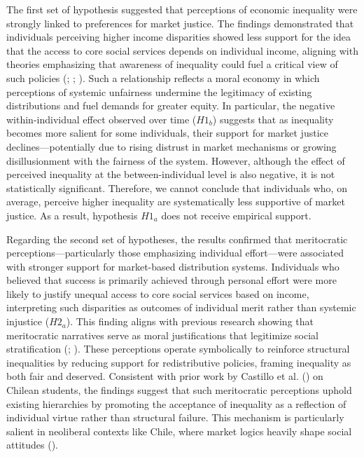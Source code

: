 \documentclass[
  12pt,
]{article}
\begin{document}
The first set of hypothesis suggested that perceptions of economic
inequality were strongly linked to preferences for market justice. The
findings demonstrated that individuals perceiving higher income
disparities showed less support for the idea that the access to core
social services depends on individual income, aligning with theories
emphasizing that awareness of inequality could fuel a critical view of
such policies (;
;
). Such a relationship
reflects a moral economy in which perceptions of systemic unfairness
undermine the legitimacy of existing distributions and fuel demands for
greater equity. In particular, the negative within-individual effect
observed over time (\(H1_{b}\)) suggests that as inequality becomes more
salient for some individuals, their support for market justice
declines---potentially due to rising distrust in market mechanisms or
growing disillusionment with the fairness of the system. However,
although the effect of perceived inequality at the between-individual
level is also negative, it is not statistically significant. Therefore,
we cannot conclude that individuals who, on average, perceive higher
inequality are systematically less supportive of market justice. As a
result, hypothesis \(H1_{a}\) does not receive empirical support.

Regarding the second set of hypotheses, the results confirmed that
meritocratic perceptions---particularly those emphasizing individual
effort---were associated with stronger support for market-based
distribution systems. Individuals who believed that success is primarily
achieved through personal effort were more likely to justify unequal
access to core social services based on income, interpreting such
disparities as outcomes of individual merit rather than systemic
injustice (\(H2_{a}\)). This finding aligns with previous research
showing that meritocratic narratives serve as moral justifications that
legitimize social stratification
(;
). These perceptions
operate symbolically to reinforce structural inequalities by reducing
support for redistributive policies, framing inequality as both fair and
deserved. Consistent with prior work by Castillo et al.
() on Chilean students,
the findings suggest that such meritocratic perceptions uphold existing
hierarchies by promoting the acceptance of inequality as a reflection of
individual virtue rather than structural failure. This mechanism is
particularly salient in neoliberal contexts like Chile, where market
logics heavily shape social attitudes
().
\end{document}
